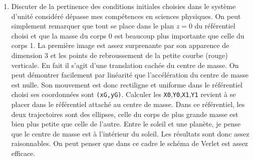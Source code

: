 \begin{enumerate}
  \item Discuter de la pertinence des conditions initiales choisies dans le système d'unité considéré dépasse mes compétences en sciences physiques. On peut simplement remarquer que tout se place dans le plan $z=0$ du référentiel choisi et que la masse du corps 0 est beaucoup plus importante que celle du corps 1.\newline
  La première image est assez surprenante par son apparence de dimension 3 et les points de rebroussement de la petite courbe (rouge) verticale. En fait il s'agit d'une translation cachée du centre de masse.\newline
  On peut démontrer facilement par linéarité que l'accélération du centre de masse est nulle. Son mouvement est donc rectiligne et uniforme dans le référentiel choisi ses coordonnées sont \texttt{(xG,yG)}.\newline
  Calculer les \texttt{X0},\texttt{Y0},\texttt{X1},\texttt{Y1} revient à se placer dans le référentiel attaché au centre de masse. Dans ce référentiel, les deux trajectoires sont des ellipses, celle du corps de plus grande masse est bien plus petite que celle de l'autre. Entre le soleil et une planète, je pense que le centre de masse est à l'intérieur du soleil.\newline
  Les résultats sont donc assez raisonnables. On peut penser que dans ce cadre le schéma de Verlet est assez efficace.
\end{enumerate}
